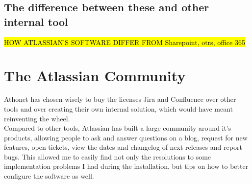 	\subsection{The difference between these and other internal tool}
		\hl{HOW ATLASSIAN'S SOFTWARE DIFFER FROM Sharepoint, otrs, office 365}

\section{The Atlassian Community}
	Athonet has chosen wisely to buy the licenses Jira and Confluence over other tools and over creating their own internal solution, which would have meant reinventing the wheel.\\
	Compared to other tools, Atlassian has built a large community around it's products, allowing people to ask and answer questions on a blog, request for new features, open tickets, view the dates and changelog of next releases and report bugs.
	This allowed me to easily find not only the resolutions to some implementation problems I had during the installation, but tips on how to better configure the software as well.

